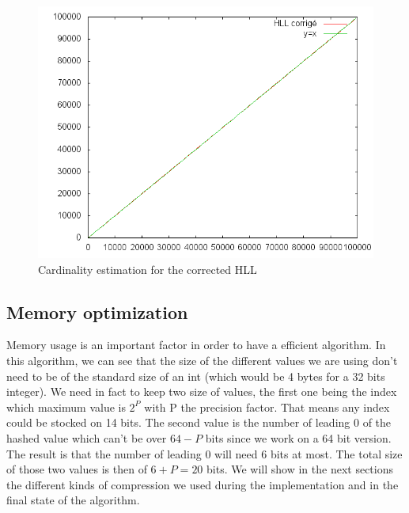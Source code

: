 \documentclass{article}
\begin{document}
\begin{center}
\begin{figure}[h]
\includegraphics[scale=0.7]{img02.png}
\caption{Cardinality estimation for the corrected HLL}
\end{figure}
\end{center}


\subsection{Memory optimization}
Memory usage is an important factor in order to have a efficient algorithm. In this algorithm, we can see that the size of the different values we are using don't need to be of the standard size of an int (which would be 4 bytes for a 32 bits integer). We need in fact to keep two size of values, the first one being the index which maximum value is $2^{P}$ with P the precision factor. That means any index could be stocked on 14 bits. The second value is the number of leading 0 of the hashed value which can't be over $64-P$ bits since we work on a 64 bit version. The result is that the number of leading 0 will need 6 bits at most. The total size of those two values is then of $6+P = 20$ bits. We will show in the next sections the different kinds of compression we used during the implementation and in the final state of the algorithm.
\end{document}
